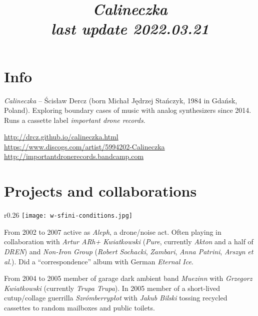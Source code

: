 \documentclass[a4paper]{article}
\title{\emph{Calineczka\\ \small last update 2022.03.21 \normalsize}}
\date{}
\begin{document}
\maketitle

\section*{Info}

\emph{Calineczka} -- Ścisław Dercz (born Michał Jędrzej Stańczyk, 1984 in Gdańsk, Poland).
Exploring boundary cases of music with analog synthesizers since 2014.
Runs a cassette label \emph{important drone records}.


\vspace{4mm}
\url{http://drcz.github.io/calineczka.html}\\
\url{https://www.discogs.com/artist/5994202-Calineczka}\\
\url{http://importantdronerecords.bandcamp.com}\\

\vspace{7mm}

\section*{Projects and collaborations}

\begin{wrapfigure}[8]{r}{0.26\textwidth}
  \vspace{-5mm}
  \centering
  \texttt{[image: w-sfini-conditions.jpg]}
\end{wrapfigure}

From 2002 to 2007 active as \emph{Aleph}, a drone/noise act. Often playing in collaboration with \emph{Artur ARh+ Kwiatkowski} (\emph{Pure}, currently \emph{Akton} and a half of \emph{DREN}) and \emph{Non-Iron Group} (\emph{Robert Sochacki}, \emph{Zambari}, \emph{Anna Patrini}, \emph{Arszyn} \emph{et al.}).
Did a ``correspondence'' album with German \emph{Eternal Ice}.

\vspace{4mm}

From 2004 to 2005 member of garage dark ambient band \emph{Muezinn} with \emph{Grzegorz Kwiatkowski} (currently \emph{Trupa Trupa}).
In 2005 member of a short-lived cutup/collage guerrilla \emph{Szrómberrypłot} with \emph{Jakub Bilski} tossing recycled cassettes to random mailboxes and public toilets.
\end{document}
